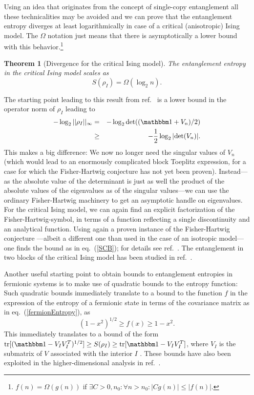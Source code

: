 \documentclass[12pt, rmp,floatfix,epsfig,graphics]{revtex4} %
\newtheorem{theorem}{Theorem}
\begin{document}
Using an idea that originates from the concept of single-copy 
entanglement all these technicalities may be avoided and we 
can prove that the entanglement entropy diverges at least 
logarithmically in case of a critical (anisotropic) Ising 
model. The $\Omega$ notation just means that there is 
asymptotically a lower bound with
this behavior.\footnote{$f(n)=\Omega(g(n))$ if
$\exists C>0,n_0:\forall n>n_0: |Cg(n)|\leq |f(n)|$.} 

\begin{theorem}[Divergence
for the critical Ising model]
The entanglement entropy in the critical Ising model scales as
\begin{equation}\label{SCB}
        S(\rho_I) = \Omega(\log_2 n).
\end{equation}
\end{theorem}

The starting point leading to this result from 
ref.\  \cite{Single} is a lower bound in the operator
norm of $\rho_I$ leading to
\begin{eqnarray}
        -\log_2 ||\rho_I||_{\infty}&=& -\log_2 \text{det}((\id +  V_n)/2)\nonumber\\
        &\geq&  -\frac{1}{2}\log_2 |\text{det}( V_n)|.
\end{eqnarray}
This makes a big difference: We now no longer need the 
singular values of $V_n$ (which would lead to an enormously 
complicated block Toeplitz expression, for a case for which 
the Fisher-Hartwig conjecture has not yet been proven).
Instead---as the absolute value of the determinant is just 
as well the product of the absolute values of the eigenvalues 
as of the singular values---we can use the ordinary 
Fisher-Hartwig machinery to get an asymptotic handle on 
eigenvalues. For the critical Ising model, we can again 
find an explicit factorization of the Fisher-Hartwig-symbol,
in terms of a function reflecting a single discontinuity and
an analytical function. Using again a proven instance of the 
Fisher-Hartwig conjecture \cite{Libby}---albeit a different 
one than used in the case of an isotropic model---one finds 
the bound as in eq.\ (\ref{SCB}); for details see
ref.\ \cite{Single}.  The entanglement in two blocks of the
critical Ising model has been studied in ref.\ 
\cite{Pascazio}.

Another useful starting point to obtain bounds to entanglement
entropies in fermionic systems is to make use of quadratic 
bounds to the entropy function: Such quadratic bounds 
immediately translate to a bound to the function $f$ in the 
expression of the entropy of a fermionic state in terms of 
the covariance matrix as in eq.\ (\ref{fermionEntropy}), as
\begin{equation}\label{fbound}
        ({1-x^2})^{1/2}\geq f(x)\geq 1-x^2.
\end{equation}
This immediately translates to a bound of the
form $\text{tr}[(\id - V_IV_I^T)^{1/2}]\geq S(\rho_I)\geq 
\text{tr}[\id - V_IV_I^T]$, where
$V_I$ is the submatrix of $V$
associated with the interior $I$ \cite{Fannes}. These bounds
have also been exploited in the higher-dimensional analysis in
ref.\ \cite{Wolf}.
\end{document}
